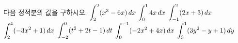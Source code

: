 다음 정적분의 값을 구하시오.
 $\displaystyle\int_{2}^{2}(x^3-6x)\mkern3mu dx$
 $\displaystyle\int_{0}^{1}4x\mkern3mu dx$
 $\displaystyle\int_{-1}^{2}(2x+3)\mkern3mu dx$
 $\displaystyle\int_{2}^{4}(-3x^2+1)\mkern3mu dx$
 $\displaystyle\int_{-2}^{0}(t^2+2t-1)\mkern3mu dt$
 $\displaystyle\int_{0}^{-1}(-2x^2+4x)\mkern3mu dx$
 $\displaystyle\int_{3}^{1}(3y^2-y+1)\mkern3mu dy$
